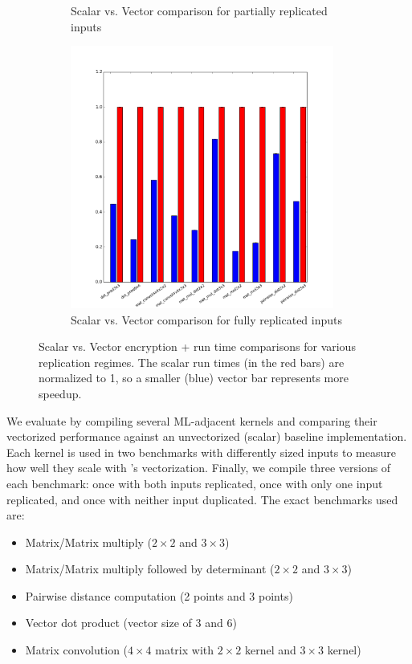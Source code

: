 \begin{figure}
\begin{subfigure}{0.3\textwidth}
        \caption{Scalar vs. Vector comparison for partially replicated inputs}\label{fig:ml-kernels-part-repl}
    \end{subfigure}
    \begin{subfigure}{0.3\textwidth}
        \includegraphics[width=0.95\textwidth]{figures/graphs/DataReplicatedENC+RUN.png}
        \caption{Scalar vs. Vector comparison for fully replicated inputs}\label{fig:ml-kernels-repl}
    \end{subfigure}
    \caption{Scalar vs. Vector encryption + run time comparisons for various replication regimes. The scalar run times (in the red bars) are normalized to 1, so a smaller (blue) vector bar represents more speedup.}\label{fig:ml-kernels}
\end{figure}

We evaluate \system by compiling several ML-adjacent kernels and comparing their vectorized performance against an unvectorized (scalar) baseline implementation.
Each kernel is used in two benchmarks with differently sized inputs to measure how well they scale with \system's vectorization.
Finally, we compile three versions of each benchmark: once with both inputs replicated, once with only one input replicated, and once with neither input duplicated. 
The exact benchmarks used are:
\begin{itemize}
    \item Matrix/Matrix multiply ($2\times 2$ and $3\times 3$)
    \item Matrix/Matrix multiply followed by determinant ($2\times 2$ and $3\times 3$)
    \item Pairwise distance computation (2 points and 3 points)
    \item Vector dot product (vector size of 3 and 6)
    \item Matrix convolution ($4\times 4$ matrix with $2\times 2$ kernel and $3\times 3$ kernel)
\end{itemize}


